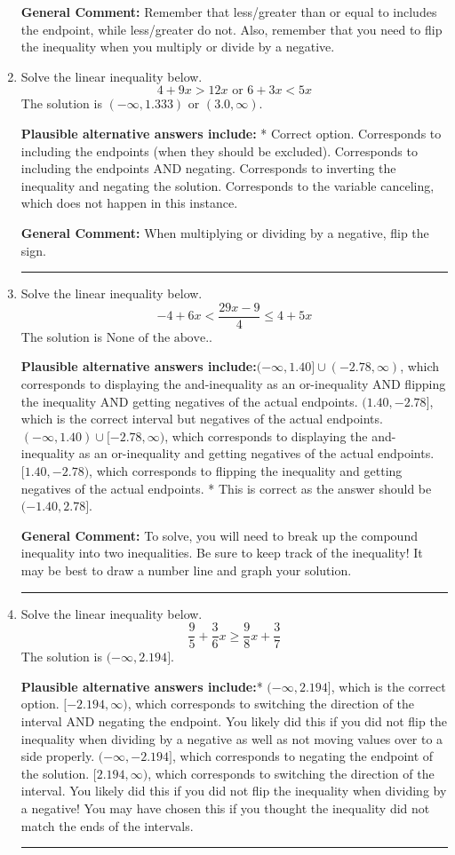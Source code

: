 \documentclass{extbook}[14pt]
\newcommand{\litem}[1]{\item #1

\rule{\textwidth}{0.4pt}}
\begin{document}
\begin{enumerate}
{\textbf{General Comment:} Remember that less/greater than or equal to includes the endpoint, while less/greater do not. Also, remember that you need to flip the inequality when you multiply or divide by a negative.
}
\litem{
Solve the linear inequality below.
\[ 4 + 9 x > 12 x \text{ or } 6 + 3 x < 5 x \]The solution is \( (-\infty, 1.333) \text{ or } (3.0, \infty) \).\begin{enumerate}[label=\Alph*.]
\textbf{Plausible alternative answers include:} * Correct option.
Corresponds to including the endpoints (when they should be excluded).
Corresponds to including the endpoints AND negating.
Corresponds to inverting the inequality and negating the solution.
Corresponds to the variable canceling, which does not happen in this instance.
\end{enumerate}

\textbf{General Comment:} When multiplying or dividing by a negative, flip the sign.
}
\litem{
Solve the linear inequality below.
\[ -4 + 6 x < \frac{29 x - 9}{4} \leq 4 + 5 x \]The solution is \( \text{None of the above.} \).\begin{enumerate}[label=\Alph*.]
\textbf{Plausible alternative answers include:}$(-\infty, 1.40] \cup (-2.78, \infty)$, which corresponds to displaying the and-inequality as an or-inequality AND flipping the inequality AND getting negatives of the actual endpoints.
$(1.40, -2.78]$, which is the correct interval but negatives of the actual endpoints.
$(-\infty, 1.40) \cup [-2.78, \infty)$, which corresponds to displaying the and-inequality as an or-inequality and getting negatives of the actual endpoints.
$[1.40, -2.78)$, which corresponds to flipping the inequality and getting negatives of the actual endpoints.
* This is correct as the answer should be $(-1.40, 2.78]$.
\end{enumerate}

\textbf{General Comment:} To solve, you will need to break up the compound inequality into two inequalities. Be sure to keep track of the inequality! It may be best to draw a number line and graph your solution.
}
\litem{
Solve the linear inequality below.
\[ \frac{9}{5} + \frac{3}{6} x \geq \frac{9}{8} x + \frac{3}{7} \]The solution is \( (-\infty, 2.194] \).\begin{enumerate}[label=\Alph*.]
\textbf{Plausible alternative answers include:}* $(-\infty, 2.194]$, which is the correct option.
 $[-2.194, \infty)$, which corresponds to switching the direction of the interval AND negating the endpoint. You likely did this if you did not flip the inequality when dividing by a negative as well as not moving values over to a side properly.
 $(-\infty, -2.194]$, which corresponds to negating the endpoint of the solution.
 $[2.194, \infty)$, which corresponds to switching the direction of the interval. You likely did this if you did not flip the inequality when dividing by a negative!
You may have chosen this if you thought the inequality did not match the ends of the intervals.
\end{enumerate}

}
\end{enumerate}
\end{document}
